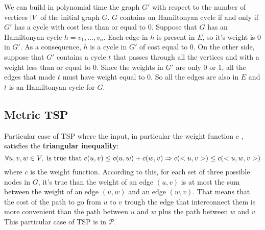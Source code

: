 We can build in polynomial time the graph $G'$ with respect to the number of vertices $|V|$ of the initial graph $G$. $G$ contains an Hamiltonyan cycle if and only if $G'$ has a cycle with cost less than or equal to 0. Suppose that $G$ has an Hamiltonyan cycle $h = v_1, \dots, v_n$. Each edge in $h$ is present in $E$, so it's weight is 0 in $G'$. As a consequence, $h$ is a cycle in $G'$ of cost equal to 0. On the other side, suppose that $G'$ contains a cycle $t$ that passes through all the vertices and with a weight less than or equal to 0. Since the weights in $G'$ are only 0 or 1, all the edges that made $t$ must have weight equal to 0. So all the edges are also in $E$ and $t$ is an Hamiltonyan cycle for $G$.

\subsection{Metric TSP}
Particular case of TSP where the input, in particular the weight function $c$ , satisfies the \textbf{triangular inequality}:
\[
\forall u, v, w \in V, \textnormal{ is true that } c(u, v) \le c(u, w) + c(w, v) \Rightarrow
c(<u, v>) \le c(<u, w, v>)
\]
where $c$ is the weight function. According to this, for each set of three possible nodes in $G$, it's true than the weight of an edge $(u, v)$ is at most the sum between the weight of an edge $(u, w)$ and an edge $(w, v)$. That means that the cost of the path to go from $u$ to $v$ trough the edge that interconnect them is more convenient than the path between $u$ and $w$ plus the path between $w$ and $v$. This particular case of TSP is in $\mathcal{P}$.